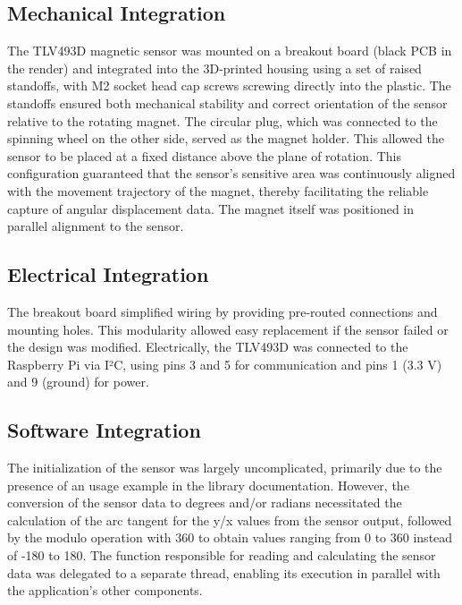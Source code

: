 	\subsection{Mechanical Integration}
	The TLV493D magnetic sensor was mounted on a breakout board (black PCB in the render) and integrated into the 3D-printed housing using a set of raised standoffs, with M2 socket head cap screws screwing directly into the plastic. The standoffs ensured both mechanical stability and correct orientation of the sensor relative to the rotating magnet. The circular plug, which was connected to the spinning wheel on the other side, served as the magnet holder. This allowed the sensor to be placed at a fixed distance above the plane of rotation. This configuration guaranteed that the sensor's sensitive area was continuously aligned with the movement trajectory of the magnet, thereby facilitating the reliable capture of angular displacement data. The magnet itself was positioned in parallel alignment to the sensor.\\
	
	\subsection{Electrical Integration}
	The breakout board simplified wiring by providing pre-routed connections and mounting holes. This modularity allowed easy replacement if the sensor failed or the design was modified. Electrically, the TLV493D was connected to the Raspberry Pi via I²C, using pins 3 and 5 for communication and pins 1 (3.3 V) and 9 (ground) for power.
	
	\subsection{Software Integration}
	The initialization of the sensor was largely uncomplicated, primarily due to the presence of an usage example in the library documentation. However, the conversion of the sensor data to degrees and/or radians necessitated the calculation of the arc tangent for the y/x values from the sensor output, followed by the modulo operation with 360 to obtain values ranging from 0 to 360 instead of -180 to 180. The function responsible for reading and calculating the sensor data was delegated to a separate thread, enabling its execution in parallel with the application's other components. 
	
